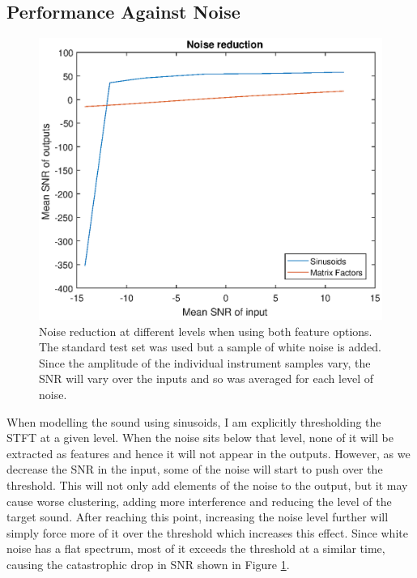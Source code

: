 \documentclass[10pt,twoside,a4paper]{report}
\begin{document}
\subsection{Performance Against Noise}




\begin{figure}
\centering
\includegraphics[width=0.7\linewidth]{./NoisePlot}
\caption{Noise reduction at different levels when using both feature options. The standard test set was used but a sample of white noise is added. Since the amplitude of the individual instrument samples vary, the SNR will vary over the inputs and so was averaged for each level of noise.}
\label{fig:NoisePlot}
\end{figure}


When modelling the sound using sinusoids, I am explicitly thresholding the STFT at a given level. When the noise sits below that level, none of it will be extracted as features and hence it will not appear in the outputs. However, as we decrease the SNR in the input, some of the noise will start to push over the threshold. This will not only add elements of the noise to the output, but it may cause worse clustering, adding more interference and reducing the level of the target sound. After reaching this point, increasing the noise level further will simply force more of it over the threshold which increases this effect. Since white noise has a flat spectrum, most of it exceeds the threshold at a similar time, causing the catastrophic drop in SNR shown in Figure \ref{fig:NoisePlot}.
\end{document}

